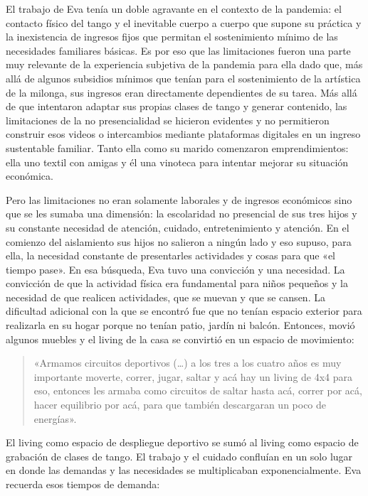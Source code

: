 El trabajo de Eva tenía un doble agravante en el contexto de la pandemia: el contacto físico del tango y el inevitable cuerpo a cuerpo que supone su práctica y la inexistencia de ingresos fijos que permitan el sostenimiento mínimo de las necesidades familiares básicas. Es por eso que las limitaciones fueron una parte muy relevante de la experiencia subjetiva de la pandemia para ella dado que, más allá de algunos subsidios mínimos que tenían para el sostenimiento de la artística de la milonga, sus ingresos eran directamente dependientes de su tarea. Más allá de que intentaron adaptar sus propias clases de tango y generar contenido, las limitaciones de la no presencialidad se hicieron evidentes y no permitieron construir esos videos o intercambios mediante plataformas digitales en un ingreso sustentable familiar. Tanto ella como su marido comenzaron emprendimientos: ella uno textil con amigas y él una vinoteca para intentar mejorar su situación económica.

Pero las limitaciones no eran solamente laborales y de ingresos económicos sino que se les sumaba una dimensión: la escolaridad no presencial de sus tres hijos y su constante necesidad de atención, cuidado, entretenimiento y atención. En el comienzo del aislamiento sus hijos no salieron a ningún lado y eso supuso, para ella, la necesidad constante de presentarles actividades y cosas para que «el tiempo pase». En esa búsqueda, Eva tuvo una convicción y una necesidad. La convicción de que la actividad física era fundamental para niños pequeños y la necesidad de que realicen actividades, que se muevan y que se cansen. La dificultad adicional con la que se encontró fue que no tenían espacio exterior para realizarla en su hogar porque no tenían patio, jardín ni balcón. Entonces, movió algunos muebles y el living de la casa se convirtió en un espacio de movimiento:

\begin{quote}
«Armamos circuitos deportivos (\ldots) a los tres a los cuatro años es muy importante moverte, correr, jugar, saltar y acá hay un living de 4x4 para eso, entonces les armaba como circuitos de saltar hasta acá, correr por acá, hacer equilibrio por acá, para que también descargaran un poco de energías».
\end{quote}

El living como espacio de despliegue deportivo se sumó al living como espacio de grabación de clases de tango. El trabajo y el cuidado confluían en un solo lugar en donde las demandas y las necesidades se multiplicaban exponencialmente. Eva recuerda esos tiempos de demanda:

